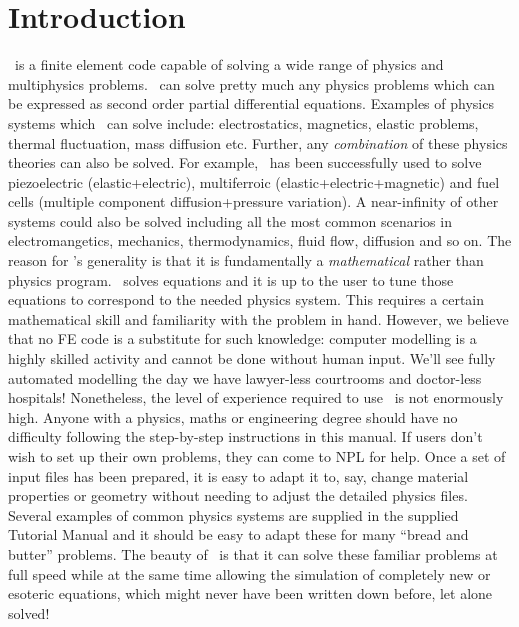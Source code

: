 \documentclass[a4paper,twoside,11pt]{book}
\begin{document}
\chapter{Introduction}
\zinc\ is a finite element code capable of solving a wide range of
physics and multiphysics problems.  \zinc\ can solve pretty much any
physics problems which can be expressed as second order partial
differential equations. Examples of physics systems which \zinc\ can
solve include: electrostatics, magnetics, elastic problems, thermal
fluctuation, mass diffusion etc. Further, any \emph{combination} of
these physics theories can also be solved.  For example, \zinc\ has
been successfully used to solve piezoelectric (elastic+electric),
multiferroic (elastic+electric+magnetic) and fuel cells (multiple
component diffusion+pressure variation). A near-infinity of other
systems could also be solved including all the most common scenarios
in electromangetics, mechanics, thermodynamics, fluid flow, diffusion
and so on.  The reason for \zinc's generality is that it is
fundamentally a \emph{mathematical} rather than physics
program. \zinc\ solves equations and it is up to the user to tune
those equations to correspond to the needed physics system. This
requires a certain mathematical skill and familiarity with the problem
in hand.  However, we believe that no FE code is a substitute for such
knowledge: computer modelling is a highly skilled activity and cannot
be done without human input. We'll see fully automated
modelling the day we have lawyer-less courtrooms and doctor-less
hospitals!  Nonetheless, the level of experience required to use \zinc\ is
not enormously high. Anyone with a physics, maths or engineering
degree should have no difficulty following the step-by-step
instructions in this manual. If users don't wish to set up their own
problems, they can come to NPL for help. Once a set of input files has
been prepared, it is easy to adapt it to, say, change material
properties or geometry without needing to adjust the detailed
physics files. Several examples of common physics systems are supplied in
the supplied Tutorial Manual and it should be easy to adapt these for
many ``bread and butter'' problems. The beauty of \zinc\ is that it
can solve these familiar problems at full speed while at the same time
allowing the simulation of completely new or esoteric equations, which
might never have been written down before, let alone solved!
\end{document}
